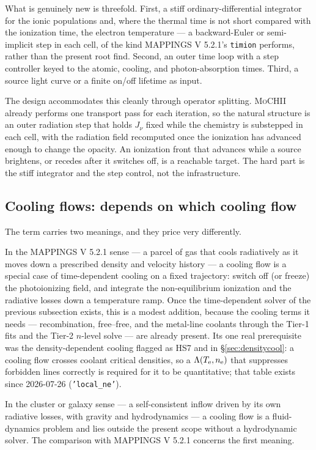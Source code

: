 \documentclass[english,a4paper]{my_memo}
\newcommand{\code}[1]{\texttt{#1}}
\newcommand{\MoCHII}{\textsc{MoCHII}}
\newcommand{\Mappings}{MAPPINGS V 5.2.1}
\newcommand{\Te}{T_{\rm e}}
\newcommand{\nelec}{n_{\rm e}}
\begin{document}
What is genuinely new is threefold.  First, a stiff ordinary-differential
integrator for the ionic populations and, where the thermal time is not
short compared with the ionization time, the electron temperature --- a
backward-Euler or semi-implicit step in each cell, of the kind
\Mappings{}'s \code{timion} performs, rather than the present root find.
Second, an outer time loop with a step controller keyed to the atomic,
cooling, and photon-absorption times.  Third, a source light curve or a
finite on/off lifetime as input.

The design accommodates this cleanly through operator splitting.
\MoCHII{} already performs one transport pass for each iteration, so the
natural structure is an outer radiation step that holds $J_\nu$ fixed
while the chemistry is substepped in each cell, with the radiation field
recomputed once the ionization has advanced enough to change the opacity.
An ionization front that advances while a source brightens, or recedes
after it switches off, is a reachable target.  The hard part is the stiff
integrator and the step control, not the infrastructure.

\subsection{Cooling flows: depends on which cooling flow}

The term carries two meanings, and they price very differently.

In the \Mappings{} sense --- a parcel of gas that cools radiatively as it
moves down a prescribed density and velocity history --- a cooling flow is
a special case of time-dependent cooling on a fixed trajectory: switch off
(or freeze) the photoionizing field, and integrate the non-equilibrium
ionization and the radiative losses down a temperature ramp.  Once the
time-dependent solver of the previous subsection exists, this is a modest
addition, because the cooling terms it needs --- recombination,
free--free, and the metal-line coolants through the Tier-1 fits and the
Tier-2 $n$-level solve --- are already present.  Its one real prerequisite
was the density-dependent cooling flagged as HS7 and in
\S\ref{sec:densitycool}: a cooling flow crosses coolant critical
densities, so a $\Lambda(\Te,\nelec)$ that suppresses forbidden lines
correctly is required for it to be quantitative; that table exists since
2026-07-26 (\code{'local\_ne'}).

In the cluster or galaxy sense --- a self-consistent inflow driven by its
own radiative losses, with gravity and hydrodynamics --- a cooling flow is
a fluid-dynamics problem and lies outside the present scope without a
hydrodynamic solver.  The comparison with \Mappings{} concerns the first
meaning.
\end{document}
